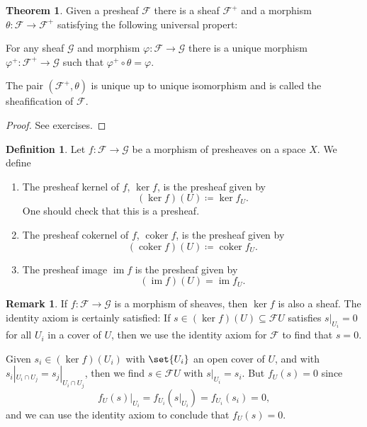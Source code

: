 \documentclass[a4paper]{amsbook}
\theoremstyle{definition}
\newtheorem{theorem}[definition]{Theorem}
\newtheorem*{definition*}{Definition}
\newtheorem*{remark*}{Remark}
\DeclareMathOperator\coker{coker}
\DeclareMathOperator\im{im}
\begin{document}
\begin{theorem}
\label{Sheafification}
Given a presheaf $\mathcal{F}$ there is a sheaf $\mathcal{F}^+$ and a morphism
$\theta\colon \mathcal{F}\to \mathcal{F}^+$ satisfying the following
universal propert:

For any sheaf $\mathcal{G}$ and morphism $\varphi\colon \mathcal{F}\to \mathcal{G}$
there is a unique morphism $\varphi^+\colon \mathcal{F}^+\to \mathcal{G}$ such
that $\varphi^+ \circ\theta = \varphi$.

The pair $(\mathcal{F}^+, \theta)$ is unique up to unique isomorphism and is called
the sheafification of $\mathcal{F}$.
\end{theorem}
\begin{proof}[Proof]
See exercises.
\end{proof}

\begin{definition*}
\label{Kernel}
Let $f\colon \mathcal{F} \to \mathcal{G}$ be a morphism of presheaves on a space
$X$. We define
\begin{enumerate}
	\item The presheaf kernel of $f$, $\ker f$, is the presheaf given by
		\[ (\ker f)(U)\coloneqq \ker f_U. \]
		One should check that this is a presheaf.

	\item The presheaf cokernel of $f$, $\coker f$, is the presheaf given by
		\[ (\coker f)(U)\coloneqq \coker f_U. \]

	\item The presheaf image $\im f$ is the presheaf given by
		\[ (\im f)(U) = \im f_U. \]
\end{enumerate}
\end{definition*}

\begin{remark*}
\label{KernelForSheaf}
If $f\colon \mathcal{F}\to \mathcal{G}$ is a morphism of sheaves, then $\ker f$ is
also a sheaf. The identity axiom is certainly satisfied: If $s \in (\ker f)(U) \subseteq \mathcal{F}U$
satisfies $s|_{U_i} = 0$ for all $U_i$ in a cover of $U$, then we use the identity axiom
for $\mathcal{F}$ to find that $s = 0$.

Given $s_i \in (\ker f)(U_i)$ with $\set{U_i}$ an open cover of $U$, and with
$s_i|_{U_i\cap U_j} = s_j|_{U_i\cap U_j}$, then we find $s \in \mathcal{F}U$ with
$s|_{U_i} = s_i$. But $f_U(s) = 0$ since
\[ f_U(s)|_{U_i} = f_{U_i}(s|_{U_i}) = f_{U_i}(s_i) = 0, \]
and we can use the identity axiom to conclude that $f_U(s) = 0$.
\end{remark*}
\end{document}
